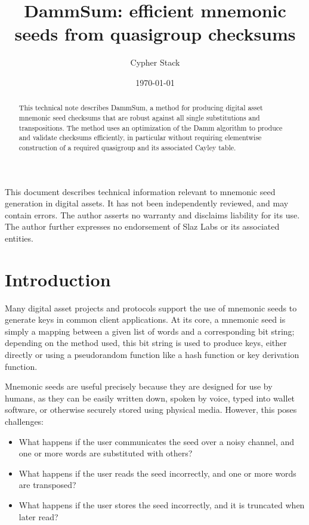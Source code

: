 \documentclass{article}
\title{DammSum: efficient mnemonic seeds from quasigroup checksums}
\author{Cypher Stack}
\date{\today}
\theoremstyle{plain}
\theoremstyle{definition}
\begin{document}
\maketitle

\begin{abstract}
This technical note describes DammSum, a method for producing digital asset mnemonic seed checksums that are robust against all single substitutions and transpositions.
The method uses an optimization of the Damm algorithm to produce and validate checksums efficiently, in particular without requiring elementwise construction of a required quasigroup and its associated Cayley table.
\end{abstract}

This document describes technical information relevant to mnemonic seed generation in digital assets.
It has not been independently reviewed, and may contain errors.
The author asserts no warranty and disclaims liability for its use.
The author further expresses no endorsement of Slaz Labs or its associated entities.


\section{Introduction}

Many digital asset projects and protocols support the use of mnemonic seeds to generate keys in common client applications.
At its core, a mnemonic seed is simply a mapping between a given list of words and a corresponding bit string; depending on the method used, this bit string is used to produce keys, either directly or using a pseudorandom function like a hash function or key derivation function.

Mnemonic seeds are useful precisely because they are designed for use by humans, as they can be easily written down, spoken by voice, typed into wallet software, or otherwise securely stored using physical media.
However, this poses challenges:
\begin{itemize}
	\item What happens if the user communicates the seed over a noisy channel, and one or more words are substituted with others?
	\item What happens if the user reads the seed incorrectly, and one or more words are transposed?
	\item What happens if the user stores the seed incorrectly, and it is truncated when later read?
\end{itemize}
\end{document}
